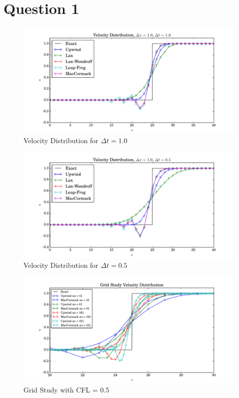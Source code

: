 \documentclass[letterpaper,12pt,]{article}
\begin{document}


\section*{Question 1}

\begin{figure}
    \centering
    \includegraphics[width = \textwidth]{./Figures/q1_1}
    \caption{Velocity Distribution for $\Delta t = 1.0$}
    \label{fig:q11}
\end{figure}

\begin{figure}
    \centering
    \includegraphics[width = \textwidth]{./Figures/q1_2}
    \caption{Velocity Distribution for $\Delta t = 0.5$}
    \label{fig:q12}
\end{figure}

\begin{figure}
    \centering
    \includegraphics[width = \textwidth]{./Figures/q2}
    \caption{Grid Study with CFL = 0.5}
    \label{fig:q2}
\end{figure}
\end{document}
